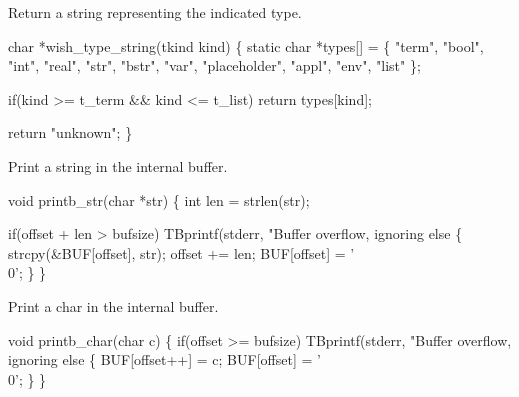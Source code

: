 
Return a string representing the indicated type.

\nwenddocs{}\endmoddef\let\nwnotused=\nwoutput{}
char *wish_type_string(tkind kind)
\{
  static char *types[] =
    \{ "term", "bool", "int", "real", "str", "bstr", "var",
      "placeholder", "appl", "env", "list"
    \};

  if(kind >= t_term && kind <= t_list)
    return types[kind];

  return "unknown";
\}
\nwendcode{}\nwdocspar



Print a string in the internal buffer.

\nwenddocs{}\endmoddef\let\nwnotused=\nwoutput{}
void printb_str(char *str)
\{
  int len = strlen(str);

  if(offset + len > bufsize)
    TBprintf(stderr, "Buffer overflow, ignoring %
  else \{
    strcpy(&BUF[offset], str);
    offset += len;
    BUF[offset] = '\\0';
  \}
\}
\nwendcode{}\nwdocspar

Print a char in the internal buffer.

\nwenddocs{}\endmoddef\let\nwnotused=\nwoutput{}
void printb_char(char c)
\{
  if(offset >= bufsize)
    TBprintf(stderr, "Buffer overflow, ignoring %
  else \{
    BUF[offset++] = c;
    BUF[offset] = '\\0';
  \}
\}
\nwendcode{}\nwdocspar



